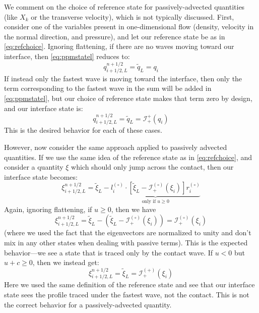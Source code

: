 \documentclass[iop]{../emulateapj}
\newcommand{\evz}{{(\circ)}}
\newcommand{\evp}{{(+)}}
\begin{document}
We comment on the choice of reference state for passively-advected
quantities (like $X_k$ or the transverse velocity), which is not typically 
discussed. First, consider one of the variables present in one-dimensional flow
(density, velocity in the normal direction, and pressure), and let our 
reference state be as in \autoref{eq:refchoice}.
Ignoring flattening, if there are no waves moving toward our
interface, then \autoref{eq:ppmstatel} reduces to:
\begin{equation}
q_{i+1/2,L}^{n+1/2} = \tilde{q}_L = q_i
\end{equation}
If instead only the fastest wave is moving toward the interface, then
only the term corresponding to the fastest wave in the sum will be
added in \autoref{eq:ppmstatel}, but our choice of reference state makes
that term zero by design, and our interface state is:
\begin{equation}
q_{i+1/2,L}^{n+1/2} = \tilde{q}_L = \mathcal{I}_+^{+}(q_i)
\end{equation}
This is the desired behavior for each of these cases. 

However, now consider the same approach applied to passively advected quantities.
If we use the same idea of the reference state as
in \autoref{eq:refchoice}, and consider a quantity $\xi$ which should only
jump across the contact, then our interface state becomes:
\begin{equation}
\xi_{i+1/2,L}^{n+1/2} = \tilde{\xi}_L -
  \underbrace{l_i^\evz \cdot \left [
        \tilde{\xi}_L  - \mathcal{I}^\evz_+(\xi_i)
       \right ] r_i^\evz}_{\text{only if~$u \ge 0$}}
\end{equation}
Again, ignoring flattening, if $u \ge 0$, then we have
\begin{equation}
\xi_{i+1/2,L}^{n+1/2} = \tilde{\xi}_L -
  \left (\tilde{\xi}_L  - \mathcal{I}^\evz_+(\xi_i) \right ) = \mathcal{I}^\evz_+(\xi_i)
\end{equation}
(where we used the fact that the eigenvectors are normalized to unity and
don't mix in any other states when dealing with passive terms).  This
is the expected behavior---we see a state that is traced only by the
contact wave.  If $u < 0$ but $u + c \ge 0$, then we instead get:
\begin{equation}
\xi_{i+1/2,L}^{n+1/2} = \tilde{\xi}_L = \mathcal{I}^\evp_+(\xi_i)
\end{equation}
Here we used the same definition of the reference state and see that our
interface state sees the profile traced under the fastest wave, not the
contact.  This is not the correct behavior for a passively-advected
quantity.  
\end{document}
